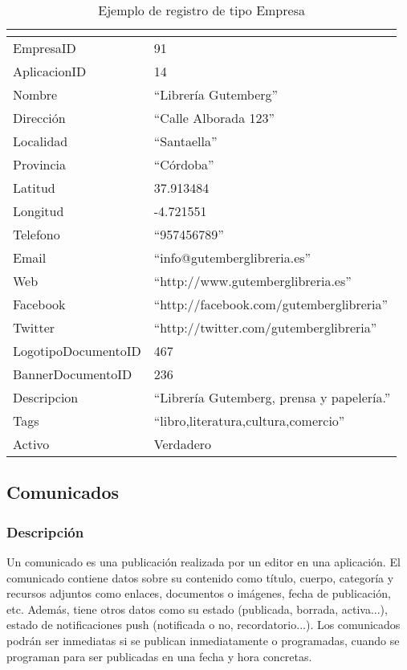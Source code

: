 \begin{table}[h]
    \centering
    \begin{tabular}{|ll|}
        \hline
        \rowcolor[HTML]{9B9B9B} 
        \multicolumn{1}{|c}{\cellcolor[HTML]{9B9B9B}{\color[HTML]{FFFFFF} Atributo}} &
        \multicolumn{1}{c|}{\cellcolor[HTML]{9B9B9B}{\color[HTML]{FFFFFF} Valor}} \\
        \hline
        EmpresaID & 91 \\
        AplicacionID & 14 \\
        Nombre & ``Librería Gutemberg'' \\
        Dirección & ``Calle Alborada 123'' \\
        Localidad & ``Santaella'' \\
        Provincia & ``Córdoba'' \\
        Latitud & 37.913484 \\
        Longitud & -4.721551 \\
        Telefono & ``957456789'' \\
        Email & ``info@gutemberglibreria.es'' \\
        Web & ``http://www.gutemberglibreria.es'' \\
        Facebook & ``http://facebook.com/gutemberglibreria'' \\
        Twitter & ``http://twitter.com/gutemberglibreria'' \\
        LogotipoDocumentoID & 467 \\
        BannerDocumentoID & 236 \\
        Descripcion & ``Librería Gutemberg, prensa y papelería.'' \\
        Tags & ``libro,literatura,cultura,comercio'' \\
        Activo & Verdadero \\
        \hline
    \end{tabular}%
    \caption{Ejemplo de registro de tipo Empresa}
    \label{cuadro:ejemplo-empresa}
\end{table}

\subsection{Comunicados}

\subsubsection*{Descripción}
Un comunicado es una publicación realizada por un editor en una aplicación. El comunicado contiene datos sobre su contenido como título, cuerpo, categoría y recursos adjuntos como enlaces, documentos o imágenes, fecha de publicación, etc. Además, tiene otros datos como su estado (publicada, borrada, activa...), estado de notificaciones push (notificada o no, recordatorio...). Los comunicados podrán ser inmediatas si se publican inmediatamente o programadas, cuando se programan para ser publicadas en una fecha y hora concretas.

